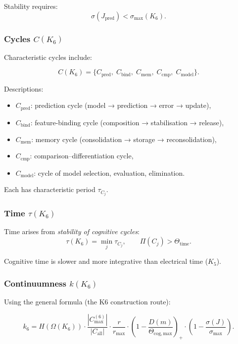 Stability requires:
\[
\sigma(J_{\mathrm{pred}}) < \sigma_{\max}(K_6).
\]

\subsubsection{Cycles \texorpdfstring{$C(K_6)$}{C(K_6)}}

Characteristic cycles include:

\[
C(K_6) =
\{
C_{\mathrm{pred}},\;
C_{\mathrm{bind}},\;
C_{\mathrm{mem}},\;
C_{\mathrm{cmp}},\;
C_{\mathrm{model}}
\}.
\]

Descriptions:
\begin{itemize}
    \item $C_{\mathrm{pred}}$: prediction cycle (model → prediction → error → update),
    \item $C_{\mathrm{bind}}$: feature-binding cycle (composition → stabilisation → release),
    \item $C_{\mathrm{mem}}$: memory cycle (consolidation → storage → reconsolidation),
    \item $C_{\mathrm{cmp}}$: comparison–differentiation cycle,
    \item $C_{\mathrm{model}}$: cycle of model selection, evaluation, elimination.
\end{itemize}

Each has characteristic period $\tau_{C_j}$.

\subsubsection{Time \texorpdfstring{$\tau(K_6)$}{\tau(K_6)}}

Time arises from \emph{stability of cognitive cycles}:
\[
\tau(K_6)
= \min_j \tau_{C_j},
\qquad
\Pi(C_j) > \Theta_{\mathrm{time}}.
\]

Cognitive time is slower and more integrative than electrical time ($K_5$).

\subsubsection{Continuumness \texorpdfstring{$k(K_6)$}{k(K_6)}}

Using the general formula (the K6 construction route):

\[
k_6
= H(\Omega(K_6))
  \cdot \frac{|C_{\max}^{(6)}|}{|C_{\mathrm{all}}|}
  \cdot \frac{r}{r_{\max}}
  \cdot \left(1 - \frac{D(m)}{\Theta_{\mathrm{cog,max}}}\right)_+
  \cdot \left(1-\frac{\sigma(J)}{\sigma_{\max}}\right).
\]


